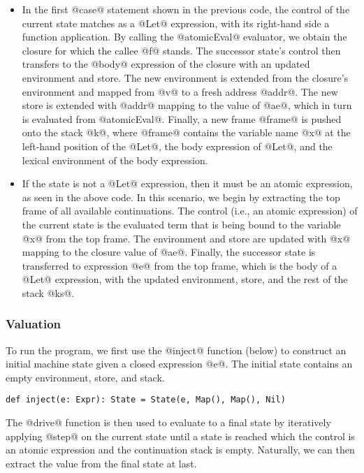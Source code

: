 \documentclass[acmsmall]{acmart}\settopmatter{}
\begin{document}
\begin{itemize}

\item In the first @case@ statement shown in the previous code,
the control of the current state matches as a @Let@ expression, with its right-hand side a
function application.
By calling the @atomicEval@ evaluator, we obtain the closure for which the callee @f@ stands.
The successor state's control then transfers to the @body@ expression of the closure
with an updated environment and store. The new environment is extended
from the closure's environment and mapped from @v@ to a fresh address @addr@.
The new store is extended with @addr@ mapping to the value of @ae@,
which in turn is evaluated from @atomicEval@.
Finally, a new frame @frame@ is pushed onto the stack @k@, where
@frame@ contains the variable name @x@ at the left-hand position of the @Let@,
the body expression of @Let@, and the lexical environment of the body expression.

\item If the state is not a @Let@ expression, then it must be
an atomic expression, as seen in the above code. In this scenario,
we begin by extracting the top frame of all available continuations.
The control (i.e., an atomic expression) of the current state is the evaluated term
that is being bound to the variable @x@ from the top frame.
The environment and store are updated with @x@ mapping to the closure value of @ae@.
Finally, the successor state is transferred to expression @e@ from the top frame,
which is the body of a @Let@ expression, with the updated environment, store, and
the rest of the stack @ks@.

\end{itemize}

\subsubsection{Valuation}

To run the program, we first use the @inject@ function (below) to construct an initial machine
state given a closed expression @e@. The initial state contains an empty environment,
store, and stack.
\begin{lstlisting}
def inject(e: Expr): State = State(e, Map(), Map(), Nil)
\end{lstlisting}

The @drive@ function is then used to evaluate
to a final state by iteratively applying @step@ on the current state until a state is reached
which the control is an atomic expression and the continuation stack is empty.
Naturally, we can then extract the value from the final state at last.
\end{document}
